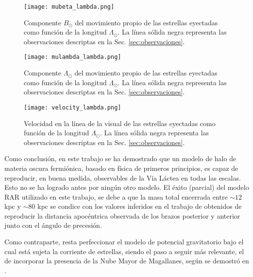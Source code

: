 \documentclass[baaa]{baaa}
\begin{document}
\begin{figure}
    \centering
    \texttt{[image: mubeta\_lambda.png]}
    \caption{Componente $B_{\odot}$ del movimiento propio de las estrellas eyectadas como función de la longitud $\Lambda_{\odot}$. La línea sólida negra representa las observaciones descriptas en la Sec. \ref{sec:observaciones}.}
    \label{fig:mubeta}
\end{figure}

\begin{figure}
    \centering
    \texttt{[image: mulambda\_lambda.png]}
    \caption{Componente $\Lambda_{\odot}$ del movimiento propio de las estrellas eyectadas como función de la longitud $\Lambda_{\odot}$. La línea sólida negra representa las observaciones descriptas en la Sec. \ref{sec:observaciones}.}
    \label{fig:mulambda}
\end{figure}

\begin{figure}
    \centering
    \texttt{[image: velocity\_lambda.png]}
    \caption{Velocidad en la línea de la visual de las estrellas eyectadas como función de la longitud $\Lambda_{\odot}$. La línea sólida negra representa las observaciones descriptas en la Sec. \ref{sec:observaciones}.}
    \label{fig:velocity}
\end{figure}

Como conclusión, en este trabajo se ha demostrado que un modelo de halo de materia oscura fermiónica, basado en física de primeros principios, es capaz de reproducir, en buena medida, observables de la Vía Láctea en todas las escalas. Esto no se ha logrado antes por ningún otro modelo. El éxito (parcial) del modelo RAR utilizado en este trabajo, se debe a que la masa total encerrada entre $\sim 12$ kpc y $\sim 80$ kpc se condice con los valores inferidos en el trabajo de \cite{Gibbons2014} obtenidos de reproducir la distancia apocéntrica observada de los brazos posterior y anterior junto con el ángulo de precesión.

Como contraparte, resta perfeccionar el modelo de potencial gravitatorio bajo el cual está sujeta la corriente de estrellas, siendo el paso a seguir más relevante, el de incorporar la presencia de la Nube Mayor de Magallanes, según se demostró en \cite{Vasiliev2021}.

\end{document}
